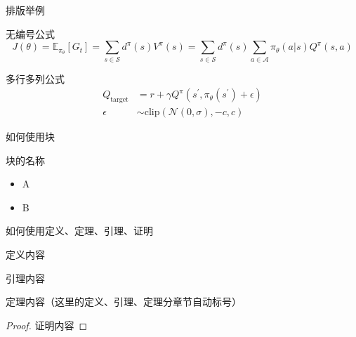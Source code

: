 \begin{frame}{排版举例}

    \begin{textbox}{无编号公式}
        \begin{equation*}
            J(\theta) = \mathbb{E}_{\pi_\theta}[G_t] = \sum_{s\in\mathcal{S}} d^\pi (s)V^\pi(s)=\sum_{s\in\mathcal{S}} d^\pi(s)\sum_{a\in\mathcal{A}}\pi_\theta(a|s)Q^\pi(s,a)
        \end{equation*}
    \end{textbox}
    \begin{textbox}{多行多列公式\footnotemark[1]}
        \begin{align}
            Q_\mathrm{target}&=r+\gamma Q^\pi(s^\prime, \pi_\theta(s^\prime)+\epsilon)\\
            \epsilon&\sim\mathrm{clip}(\mathcal{N}(0, \sigma), -c, c)\nonumber
        \end{align}
    \end{textbox}
\end{frame}


\begin{frame}{如何使用块}
\begin{block}{块的名称}
    \begin{itemize}
        \item A
        \item B
    \end{itemize}
\end{block}
\end{frame}

\begin{frame}[shrink=8]{如何使用定义、定理、引理、证明}

\kaishu
\begin{define}[定义名称]
    定义内容
\end{define}

\begin{lem}[引理名称]
    引理内容
\end{lem}

\begin{thm}[定理名称]
    定理内容（这里的定义、引理、定理分章节自动标号）
\end{thm}

\begin{proof}
    证明内容
\end{proof}

\end{frame}

